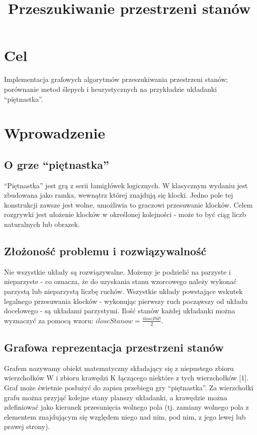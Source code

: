 \documentclass{classrep}
\author{
  \studentinfo{Marcin Pajkowski}{211968} \and
  \studentinfo{Rafał Warda}{214067}
}
\title{Przeszukiwanie przestrzeni stanów}
\begin{document}
\begin{titlepage}
  \maketitle
  \thispagestyle{empty}
\end{titlepage}

\section{Cel}

Implementacja grafowych algorytmów przeszukiwania przestrzeni stanów;
porównanie metod ślepych i heurystycznych na przykładzie układanki
``piętnastka''.

\section{Wprowadzenie}

\subsection{O grze ``piętnastka''}

``Piętnastka'' jest grą z serii łamigłówek logicznych. W klasycznym wydaniu
jest zbudowana jako ramka, wewnątrz której znajdują się klocki. Jedno pole
tej konstrukcji zawsze jest wolne, umożliwia to graczowi przesuwanie klocków.
Celem rozgrywki jest ułożenie klocków w określonej kolejności - może to być
ciąg liczb naturalnych lub obrazek.

\subsection{Złożoność problemu i rozwiązywalność}

Nie wszystkie układy są rozwiązywalne. Możemy je podzielić na parzyste i nieparzyste - co
oznacza, że do uzyskania stanu wzorcowego należy wykonać parzystą lub
nieparzystą liczbę ruchów. Wszystkie układy powstające wskutek legalnego
przesuwania klocków - wykonując pierwszy ruch począwszy od układu docelowego - są układami parzystymi.
 Ilość stanów każdej układanki można wyznaczyć za pomocą wzoru:
$ iloscStanow = \frac{iloscPol!}2 $.

\subsection{Grafowa reprezentacja przestrzeni stanów}

Grafem nazywamy obiekt matematyczny składający się z niepustego zbioru
wierzchołków W i zbioru krawędzi K łączącego niektóre z tych
wierzchołków {[}1{]}. Graf może świetnie posłużyć do zapisu przebiegu
gry ``piętnastka''. Za wierzchołki grafu można przyjąć kolejne stany
planszy układanki, a krawędzie można zdefiniować jako kierunek
przesunięcia wolnego pola (tj. zamiany wolnego pola z elementem
znajdującym się względem niego nad nim, pod nim, z jego lewej lub prawej
strony).
\end{document}
